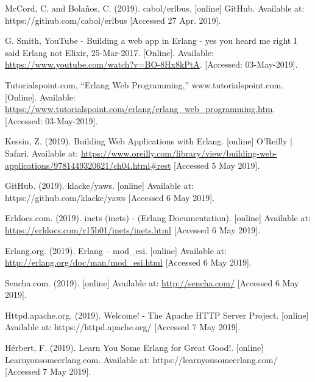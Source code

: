 \documentclass[11 pt]{IEEEtran}
\begin{document}
\begin{thebibliography}{99}
McCord, C. and Bolaños, C. (2019). cabol/erlbus. [online] GitHub. Available at: https://github.com/cabol/erlbus [Accessed 27 Apr. 2019].

G. Smith, YouTube - Building a web app in Erlang - yes you heard me right I said Erlang not Elixir, 25-Mar-2017. [Online]. Available: \url{https://www.youtube.com/watch?v=BO-8Hx8kPtA}. [Accessed: 03-May-2019].

Tutorialspoint.com, ``Erlang Web Programming,'' www.tutorialspoint.com. [Online]. Available: \url{https://www.tutorialspoint.com/erlang/erlang_web_programming.htm}. [Accessed: 03-May-2019].

Kessin, Z. (2019). Building Web Applications with Erlang. [online] O'Reilly | Safari. Available at: \url{https://www.oreilly.com/library/view/building-web-applications/9781449320621/ch04.html#rest} [Accessed 5 May 2019].

GitHub. (2019). klacke/yaws. [online] Available at: https://github.com/klacke/yaws [Accessed 6 May 2019].

Erldocs.com. (2019). inets (inets) - (Erlang Documentation). [online] Available at: \url{https://erldocs.com/r15b01/inets/inets.html} [Accessed 6 May 2019].

Erlang.org. (2019). Erlang -- mod\_esi. [online] Available at: \url{http://erlang.org/doc/man/mod_esi.html} [Accessed 6 May 2019].

Sencha.com. (2019). [online] Available at: \url{http://sencha.com/} [Accessed 6 May 2019].

Httpd.apache.org. (2019). Welcome! - The Apache HTTP Server Project. [online] Available at: https://httpd.apache.org/ [Accessed 7 May 2019].

Hérbert, F. (2019). Learn You Some Erlang for Great Good!. [online] Learnyousomeerlang.com. Available at: https://learnyousomeerlang.com/ [Accessed 7 May 2019].

\end{thebibliography}
\end{document}
